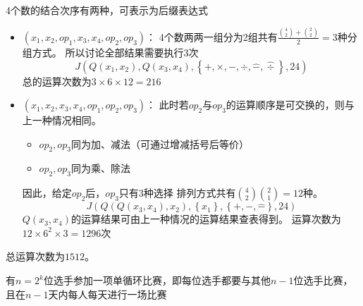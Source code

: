 \begin{questions}
\begin{solution}
        4个数的结合次序有两种，可表示为后缀表达式
        \begin{itemize}
            \item $(x_1, x_2, op_1, x_3, x_4, op_2, op_3)$：
                  4个数两两一组分为2组共有$\frac{\binom{4}{2} + \binom{2}{2}}{2}=3$种分组方式。
                  所以讨论全部结果需要执行3次\[
                      J\left( Q(x_1,x_2), Q(x_3, x_4), \left\{+, \times, -, \div, \hat{-} , \hat{\div} \right\}, 24 \right)
                  \]
                  总的运算次数为$3 \times 6 \times 12 = 216$
            \item $(x_1, x_2, x_3, x_4, op_1, op_2, op_3)$：
                  此时若$op_2$与$op_3$的运算顺序是可交换的，则与上一种情况相同。
                  \begin{itemize}
                      \item $op_2, op_3$同为加、减法（可通过增减括号后等价）
                      \item $op_2, op_3$同为乘、除法
                  \end{itemize}
                  因此，给定$op_2$后，$op_3$只有3种选择
                  排列方式共有$\binom{4}{2}\binom{2}{1} = 12$种。
                  \[
                      J\left(Q(Q(x_3, x_4), x_2), \left\{x_1\right\}, \left\{+, -, \hat{-}\right\}, 24\right)
                  \]
                  $Q(x_3, x_4)$的运算结果可由上一种情况的运算结果查表得到。
                  运算次数为$12 \times 6^2 \times 3 = 1296$次
        \end{itemize}

        总运算次数为$1512$。
    \end{solution}

    \question 有$n=2^k$位选手参加一项单循环比赛，即每位选手都要与其他$n-1$位选手比赛，且在$n-1$天内每人每天进行一场比赛
    \begin{parts}

\end{parts}
\end{questions}

